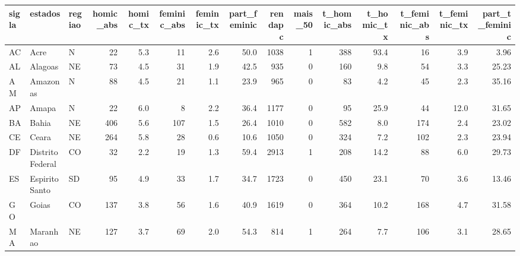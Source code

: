 \documentclass[
  letterpaper,
  DIV=11,
  numbers=noendperiod]{scrreprt}
\begin{document}
\begin{table}
\centering
\begin{tabular}[t]{l|l|l|r|r|r|r|r|r|r|r|r|r|r|r}
\hline
sigla & estados & regiao & homic\_abs & homic\_tx & feminic\_abs & feminic\_tx & part\_feminic & rendapc & mais\_50 & t\_homic\_abs & t\_homic\_tx & t\_feminic\_abs & t\_feminic\_tx & part\_t\_feminic\\
\hline
AC & Acre & N & 22 & 5.3 & 11 & 2.6 & 50.0 & 1038 & 1 & 388 & 93.4 & 16 & 3.9 & 3.96\\
\hline
AL & Alagoas & NE & 73 & 4.5 & 31 & 1.9 & 42.5 & 935 & 0 & 160 & 9.8 & 54 & 3.3 & 25.23\\
\hline
AM & Amazonas & N & 88 & 4.5 & 21 & 1.1 & 23.9 & 965 & 0 & 83 & 4.2 & 45 & 2.3 & 35.16\\
\hline
AP & Amapa & N & 22 & 6.0 & 8 & 2.2 & 36.4 & 1177 & 0 & 95 & 25.9 & 44 & 12.0 & 31.65\\
\hline
BA & Bahia & NE & 406 & 5.6 & 107 & 1.5 & 26.4 & 1010 & 0 & 582 & 8.0 & 174 & 2.4 & 23.02\\
\hline
CE & Ceara & NE & 264 & 5.8 & 28 & 0.6 & 10.6 & 1050 & 0 & 324 & 7.2 & 102 & 2.3 & 23.94\\
\hline
DF & Distrito Federal & CO & 32 & 2.2 & 19 & 1.3 & 59.4 & 2913 & 1 & 208 & 14.2 & 88 & 6.0 & 29.73\\
\hline
ES & Espirito Santo & SD & 95 & 4.9 & 33 & 1.7 & 34.7 & 1723 & 0 & 450 & 23.1 & 70 & 3.6 & 13.46\\
\hline
GO & Goias & CO & 137 & 3.8 & 56 & 1.6 & 40.9 & 1619 & 0 & 364 & 10.2 & 168 & 4.7 & 31.58\\
\hline
MA & Maranhao & NE & 127 & 3.7 & 69 & 2.0 & 54.3 & 814 & 1 & 264 & 7.7 & 106 & 3.1 & 28.65\\
\hline
\end{tabular}
\end{table}
\end{document}
